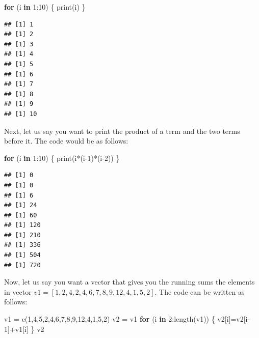 \documentclass[
]{article}
\newenvironment{Shaded}{\begin{snugshade}}{\end{snugshade}}
\newcommand{\ControlFlowTok}[1]{\textcolor[rgb]{0.13,0.29,0.53}{\textbf{#1}}}
\newcommand{\DecValTok}[1]{\textcolor[rgb]{0.00,0.00,0.81}{#1}}
\newcommand{\FunctionTok}[1]{\textcolor[rgb]{0.00,0.00,0.00}{#1}}
\newcommand{\NormalTok}[1]{#1}
\newcommand{\OtherTok}[1]{\textcolor[rgb]{0.56,0.35,0.01}{#1}}
\newcommand{\SpecialCharTok}[1]{\textcolor[rgb]{0.00,0.00,0.00}{#1}}
\begin{document}
\begin{Shaded}
\begin{Highlighting}[]
\ControlFlowTok{for}\NormalTok{ (i }\ControlFlowTok{in} \DecValTok{1}\SpecialCharTok{:}\DecValTok{10}\NormalTok{)}
\NormalTok{\{}
  \FunctionTok{print}\NormalTok{(i)}
\NormalTok{\}}
\end{Highlighting}
\end{Shaded}

\begin{verbatim}
## [1] 1
## [1] 2
## [1] 3
## [1] 4
## [1] 5
## [1] 6
## [1] 7
## [1] 8
## [1] 9
## [1] 10
\end{verbatim}

Next, let us say you want to print the product of a term and the two
terms before it. The code would be as follows:

\begin{Shaded}
\begin{Highlighting}[]
\ControlFlowTok{for}\NormalTok{ (i }\ControlFlowTok{in} \DecValTok{1}\SpecialCharTok{:}\DecValTok{10}\NormalTok{)}
\NormalTok{\{}
  \FunctionTok{print}\NormalTok{(i}\SpecialCharTok{*}\NormalTok{(i}\DecValTok{{-}1}\NormalTok{)}\SpecialCharTok{*}\NormalTok{(i}\DecValTok{{-}2}\NormalTok{))}
\NormalTok{\}}
\end{Highlighting}
\end{Shaded}

\begin{verbatim}
## [1] 0
## [1] 0
## [1] 6
## [1] 24
## [1] 60
## [1] 120
## [1] 210
## [1] 336
## [1] 504
## [1] 720
\end{verbatim}

Now, let us say you want a vector that gives you the running sums the
elements in vector \(v1 = [1,2,4,2,4,6,7,8,9,12,4,1,5,2]\). The code can
be written as follows:

\begin{Shaded}
\begin{Highlighting}[]
\NormalTok{v1 }\OtherTok{=} \FunctionTok{c}\NormalTok{(}\DecValTok{1}\NormalTok{,}\DecValTok{4}\NormalTok{,}\DecValTok{5}\NormalTok{,}\DecValTok{2}\NormalTok{,}\DecValTok{4}\NormalTok{,}\DecValTok{6}\NormalTok{,}\DecValTok{7}\NormalTok{,}\DecValTok{8}\NormalTok{,}\DecValTok{9}\NormalTok{,}\DecValTok{12}\NormalTok{,}\DecValTok{4}\NormalTok{,}\DecValTok{1}\NormalTok{,}\DecValTok{5}\NormalTok{,}\DecValTok{2}\NormalTok{)}
\NormalTok{v2 }\OtherTok{=}\NormalTok{ v1}
\ControlFlowTok{for}\NormalTok{ (i }\ControlFlowTok{in} \DecValTok{2}\SpecialCharTok{:}\FunctionTok{length}\NormalTok{(v1))}
\NormalTok{\{}
\NormalTok{  v2[i]}\OtherTok{=}\NormalTok{v2[i}\DecValTok{{-}1}\NormalTok{]}\SpecialCharTok{+}\NormalTok{v1[i]}
\NormalTok{\}}
\NormalTok{v2}
\end{Highlighting}
\end{Shaded}
\end{document}
